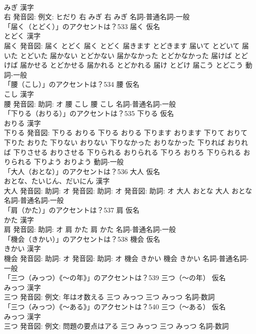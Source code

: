 \documentclass[8pt]{extreport}
\begin{document}
\begin{CJK}{UTF8}{min}
\\	みぎ 漢字　
\\	右 発音図: 例文: ヒだり	右 みぎ		右 みぎ				名詞-普通名詞-一般 
\\	「届く（とどく）」のアクセントは？533	届く 仮名　
\\	とどく 漢字　
\\	届く 発音図:	届く とどく		届く とどく 届きます とどきます 届いて とどいて 届いた とどいた 届かない とどかない 届かなかった とどかなかった 届けば とどけば 届かせる とどかせる 届かれる とどかれる 届け とどけ 届こう とどこう				動詞-一般 
\\	「腰（こし）」のアクセントは？534	腰 仮名　
\\	こし 漢字　
\\	腰 発音図: 助詞: オ	腰 こし		腰 こし				名詞-普通名詞-一般 
\\	「下りる（おりる）」のアクセントは？535	下りる 仮名　
\\	おりる 漢字　
\\	下りる 発音図:	下りる おりる		下りる おりる 下ります おります 下りて おりて 下りた おりた 下りない おりない 下りなかった おりなかった 下りれば おりれば 下りさせる おりさせる 下りられる おりられる 下りろ おりろ 下りられる おりられる 下りよう おりよう				動詞-一般 
\\	「大人（おとな）」のアクセントは？536	大人 仮名　
\\	おとな、たいじん、だいにん 漢字　
\\	大人 発音図: 助詞: オ 発音図: 助詞: オ 発音図: 助詞: オ	大人 おとな		大人 おとな				名詞-普通名詞-一般 
\\	「肩（かた）」のアクセントは？537	肩 仮名　
\\	かた 漢字　
\\	肩 発音図: 助詞: オ	肩 かた		肩 かた				名詞-普通名詞-一般 
\\	「機会（きかい）」のアクセントは？538	機会 仮名　
\\	きかい 漢字　
\\	機会 発音図: 助詞: オ 発音図: 助詞: オ	機会 きかい		機会 きかい				名詞-普通名詞-一般 
\\	「三つ（みっつ）《〜の年》」のアクセントは？539	三つ（〜の年） 仮名　
\\	みっつ 漢字　
\\	三つ 発音図: 例文: 年はオ数える	三つ みっつ		三つ みっつ				名詞-数詞 
\\	「三つ（みっつ）《〜ある》」のアクセントは？540	三つ（〜ある） 仮名　
\\	みっつ 漢字　
\\	三つ 発音図: 例文: 問題の要点はアる	三つ みっつ		三つ みっつ				名詞-数詞 

\end{CJK}
\end{document}
